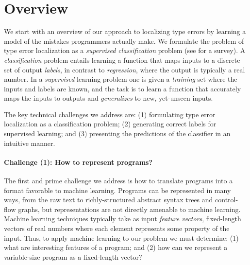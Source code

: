 \section{Overview}
\label{sec:overview}

We start with an overview of our approach to localizing type errors by
learning a model of the mistakes programmers actually make.
%
We formulate the problem of type error localization as a
\emph{supervised classification} problem (see \citealt{Kotsiantis2007-pj}
for a survey).
%
A \emph{classification} problem entails learning a function that maps
inputs to a discrete set of output \emph{labels}, in contrast to
\emph{regression}, where the output is typically a real number.
%
In a \emph{supervised} learning problem one is given a \emph{training}
set where the inputs and labels are known, and the task is to learn a
function that accurately maps the inputs to outputs and
\emph{generalizes} to new, yet-unseen inputs.

The key technical challenges we address are:
%
(1) formulating type error localization as a classification problem;
%
(2) generating correct labels for supervised learning; and
%
(3) presenting the predictions of the classifier in an intuitive manner.

\paragraph{\textbf{Challenge (1): How to represent programs?}}
The first and prime challenge we address is how to translate programs
into a format favorable to machine learning. 
%
Programs can be represented in many ways, from the raw text to 
richly-structured abstract syntax trees and control-flow graphs, but 
representations are not directly amenable to machine learning.
%
Machine learning techniques typically take as input \emph{feature
vectors}, fixed-length vectors of real numbers where each element
represents some property of the input.
%
Thus, to apply machine learning to our problem we must
determine:
%
(1) what are interesting features of a program; and
%
(2) how can we represent a variable-size program as a fixed-length vector?

